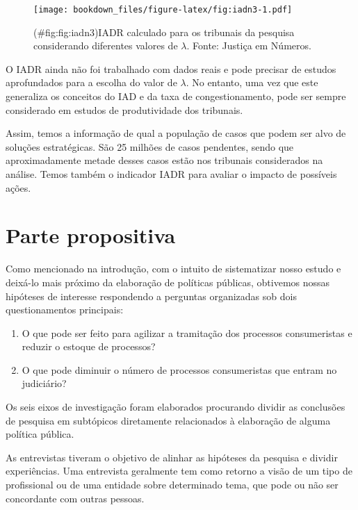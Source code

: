 \documentclass[]{report}
\providecommand{\tightlist}{%
  \setlength{\itemsep}{0pt}\setlength{\parskip}{0pt}}
\begin{document}
\begin{figure}[htbp]
\centering
\texttt{[image: bookdown\_files/figure-latex/fig:iadn3-1.pdf]}
\caption{(\#fig:fig:iadn3)IADR calculado para os tribunais da pesquisa
considerando diferentes valores de \(\lambda\). Fonte: Justiça em
Números.}
\end{figure}

O IADR ainda não foi trabalhado com dados reais e pode precisar de
estudos aprofundados para a escolha do valor de \(\lambda\). No entanto,
uma vez que este generaliza os conceitos do IAD e da taxa de
congestionamento, pode ser sempre considerado em estudos de
produtividade dos tribunais.

Assim, temos a informação de qual a população de casos que podem ser
alvo de soluções estratégicas. São 25 milhões de casos pendentes, sendo
que aproximadamente metade desses casos estão nos tribunais considerados
na análise. Temos também o indicador IADR para avaliar o impacto de
possíveis ações.

\section{Parte propositiva}\label{parte-propositiva}

Como mencionado na introdução, com o intuito de sistematizar nosso
estudo e deixá-lo mais próximo da elaboração de políticas públicas,
obtivemos nossas hipóteses de interesse respondendo a perguntas
organizadas sob dois questionamentos principais:

\begin{enumerate}
\def\labelenumi{\arabic{enumi}.}
\tightlist
\item
  O que pode ser feito para agilizar a tramitação dos processos
  consumeristas e reduzir o estoque de processos?
\item
  O que pode diminuir o número de processos consumeristas que entram no
  judiciário?
\end{enumerate}

Os seis eixos de investigação foram elaborados procurando dividir as
conclusões de pesquisa em subtópicos diretamente relacionados à
elaboração de alguma política pública.

As entrevistas tiveram o objetivo de alinhar as hipóteses da pesquisa e
dividir experiências. Uma entrevista geralmente tem como retorno a visão
de um tipo de profissional ou de uma entidade sobre determinado tema,
que pode ou não ser concordante com outras pessoas.
\end{document}
